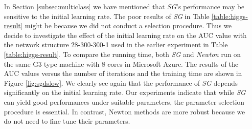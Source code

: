 \documentclass[12pt]{article}
\begin{document}
\par In Section \ref{subsec:multiclass} we have mentioned that {\sl SG}'s performance may be sensitive to the initial learning rate. The poor results of {\sl SG} in Table \ref{table:higgs-result} might be because we did not conduct a selection procedure. Thus we decide to investigate the effect of the initial learning rate on the AUC value with the network structure 28-300-300-1 used in the earlier experiment in Table \ref{table:higgs-result}. To compare the running time, both {\sl SG} and {\sl Newton} run on the same G3 type machine with $8$ cores in Microsoft Azure. The results of the AUC values versus the number of iterations and the training time are shown in Figure \ref{fig:sgdslow}. We clearly see again that the performance of {\sl SG} depends significantly on the initial learning rate. Our experiments indicate that while {\sl SG} can yield good performances under suitable parameters, the parameter selection procedure is essential. In contrast, Newton methods are more robust because we do not need to fine tune their parameters.
\end{document}
